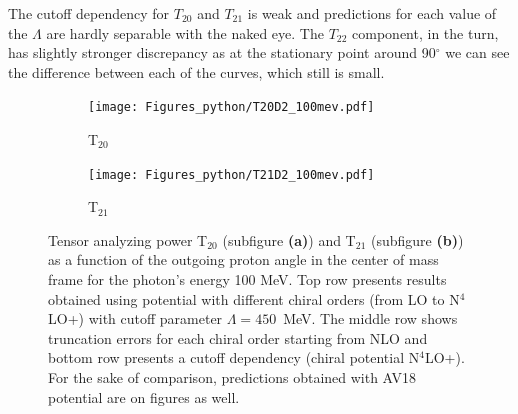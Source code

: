    The cutoff dependency for $T_{20}$ and $T_{21}$ is weak and 
    predictions for each value of the $\Lambda$ are hardly separable 
    with the naked eye. The $T_{22}$ component, in the turn, 
    has slightly stronger discrepancy as at the stationary point around 90$^\circ$
    we can see the difference between each of the curves, which still is small.

    \begin{figure}[htb]
        \centering
        \begin{subfigure}[b]{0.46\textwidth}
            \texttt{[image: Figures\_python/T20D2\_100mev.pdf]}
            \caption{T$_{20}$}
            \label{T20_100_vert}
        \end{subfigure}
        \begin{subfigure}[b]{0.46\textwidth}
            \texttt{[image: Figures\_python/T21D2\_100mev.pdf]}
            \caption{T$_{21}$}
            \label{T21_100_vert}
        \end{subfigure}
        \caption{Tensor analyzing power T$_{20}$ (subfigure {\bf (a)})
        and T$_{21}$ (subfigure {\bf (b)})
        as a function of the outgoing proton angle in the center of mass frame 
        for the photon's energy 100 MeV.
        Top row presents results obtained using potential
        with different chiral orders (from LO to N$^4$LO+) with cutoff parameter $\Lambda=450$~MeV.
        The middle row shows truncation errors for each 
        chiral order starting from NLO and
        bottom row presents a cutoff dependency (chiral potential N$^4$LO+).
        For the sake of comparison, predictions obtained with AV18 potential are on figures as well.}
        \label{T20_T21_100}
    \end{figure}



